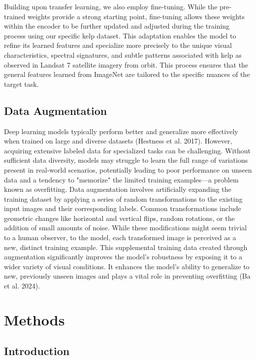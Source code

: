 \documentclass{article}
\begin{document}
Building upon transfer learning, we also employ fine-tuning. While the pre-trained weights provide a strong starting point, fine-tuning allows these weights within the encoder to be further updated and adjusted during the training process using our specific kelp dataset. This adaptation enables the model to refine its learned features and specialize more precisely to the unique visual characteristics, spectral signatures, and subtle patterns associated with kelp as observed in Landsat 7 satellite imagery from orbit. This process ensures that the general features learned from ImageNet are tailored to the specific nuances of the target task.

\subsection{Data Augmentation} 

Deep learning models typically perform better and generalize more effectively when trained on large and diverse datasets (Hestness et al. 2017). However, acquiring extensive labeled data for specialized tasks can be challenging. Without sufficient data diversity, models may struggle to learn the full range of variations present in real-world scenarios, potentially leading to poor performance on unseen data and a tendency to "memorize" the limited training examples—a problem known as overfitting. Data augmentation involves artificially expanding the training dataset by applying a series of random transformations to the existing input images and their corresponding labels. Common transformations include geometric changes like horizontal and vertical flips, random rotations, or the addition of small amounts of noise. While these modifications might seem trivial to a human observer, to the model, each transformed image is perceived as a new, distinct training example. This supplemental training data created through augmentation significantly improves the model's robustness by exposing it to a wider variety of visual conditions. It enhances the model's ability to generalize to new, previously unseen images and plays a vital role in preventing overfitting (Ba et al. 2024).


\section{Methods}

\subsection{Introduction}
\end{document}
